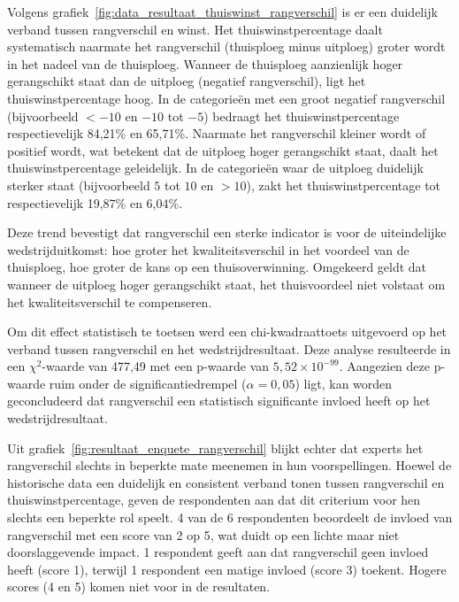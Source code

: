Volgens grafiek~\ref{fig:data_resultaat_thuiswinst_rangverschil} is er een duidelijk verband tussen rangverschil en winst.
Het thuiswinstpercentage daalt systematisch naarmate het rangverschil (thuisploeg minus uitploeg) groter wordt in het nadeel van de thuisploeg.
Wanneer de thuisploeg aanzienlijk hoger gerangschikt staat dan de uitploeg (negatief rangverschil), ligt het thuiswinstpercentage hoog.
In de categorieën met een groot negatief rangverschil (bijvoorbeeld $<-10$ en $-10$ tot $-5$) bedraagt het thuiswinstpercentage respectievelijk 84,21\% en 65,71\%.
Naarmate het rangverschil kleiner wordt of positief wordt, wat betekent dat de uitploeg hoger gerangschikt staat, daalt het thuiswinstpercentage geleidelijk.
In de categorieën waar de uitploeg duidelijk sterker staat (bijvoorbeeld $5$ tot $10$ en $>10$), zakt het thuiswinstpercentage tot respectievelijk 19,87\% en 6,04\%.

Deze trend bevestigt dat rangverschil een sterke indicator is voor de uiteindelijke wedstrijduitkomst: hoe groter het kwaliteitsverschil in het voordeel van de thuisploeg, hoe groter de kans op een thuisoverwinning.
Omgekeerd geldt dat wanneer de uitploeg hoger gerangschikt staat, het thuisvoordeel niet volstaat om het kwaliteitsverschil te compenseren.

\vspace{5pt}

Om dit effect statistisch te toetsen werd een chi-kwadraattoets uitgevoerd op het verband tussen rangverschil en het wedstrijdresultaat.
Deze analyse resulteerde in een $\chi^2$-waarde van 477,49 met een p-waarde van $5{,}52 \times 10^{-99}$.
Aangezien deze p-waarde ruim onder de significantiedrempel ($\alpha = 0{,}05$) ligt, kan worden geconcludeerd dat rangverschil een statistisch significante invloed heeft op het wedstrijdresultaat.

\vspace{5pt}

Uit grafiek~\ref{fig:resultaat_enquete_rangverschil} blijkt echter dat experts het rangverschil slechts in beperkte mate meenemen in hun voorspellingen.
Hoewel de historische data een duidelijk en consistent verband tonen tussen rangverschil en thuiswinstpercentage, geven de respondenten aan dat dit criterium voor hen slechts een beperkte rol speelt.
4 van de 6 respondenten beoordeelt de invloed van rangverschil met een score van 2 op 5, wat duidt op een lichte maar niet doorslaggevende impact.
1 respondent geeft aan dat rangverschil geen invloed heeft (score 1), terwijl 1 respondent een matige invloed (score 3) toekent.
Hogere scores (4 en 5) komen niet voor in de resultaten.

